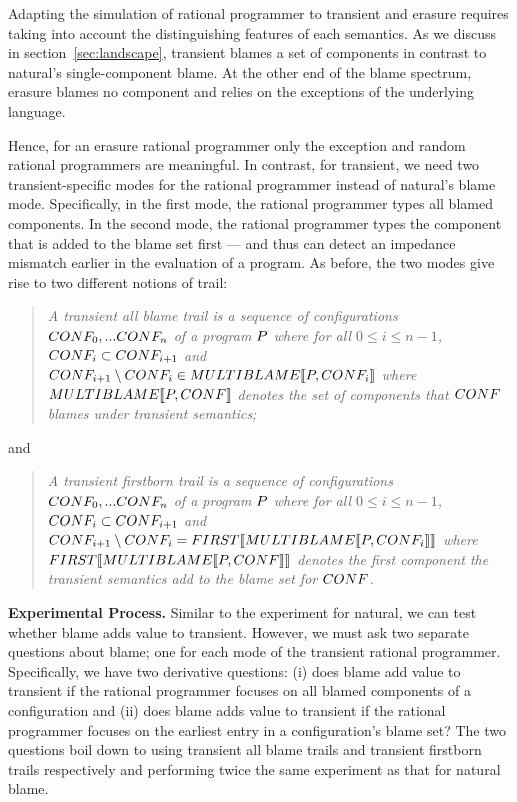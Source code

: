 Adapting the simulation of rational programmer to transient
and erasure requires taking into account the distinguishing
features of each semantics. As we discuss in section~\ref{sec:landscape}, 
transient blames a set of components in contrast to natural's
single-component blame. At the other end of the blame spectrum, erasure
blames no component and relies on the exceptions of the underlying
language.

Hence, for an erasure rational programmer only the exception and random 
rational programmers are meaningful. In contrast, for transient, we 
need two transient-specific modes for the rational
programmer instead of natural's blame mode. Specifically, in the first mode, the rational programmer types
all blamed components.  In the second mode, the rational programmer types
the component that is added to the blame set first --- and thus can 
detect an impedance mismatch earlier in the evaluation of a program. 
As before, the two modes give
rise to two different notions of trail:
\begin{quote}
\it 
A  transient all blame trail
is a sequence of configurations $CONF_0,...CONF_n$ of a program
$P$ where for all $0 \leq i \leq n - 1$, $CONF_i \subset CONF_{i+1}$ and
~$CONF_{i+1} \setminus CONF_i \in MULTIBLAME\llbracket P, CONF_i\rrbracket$
where $MULTIBLAME\llbracket P, CONF\rrbracket$ denotes the set of components that $CONF$
blames under transient semantics; 
\end{quote}
\noindent
and
\begin{quote}
\it 
A transient firstborn  trail
is a sequence of configurations $CONF_0,...CONF_n$ of a program
$P$ where for all $0 \leq i \leq n - 1$, $CONF_i \subset CONF_{i+1}$ and
  $CONF_{i+1} \setminus CONF_i = FIRST\llbracket MULTIBLAME\llbracket P, CONF_i\rrbracket\rrbracket$
  where $FIRST\llbracket MULTIBLAME\llbracket P, CONF\rrbracket\rrbracket$ denotes the first component 
  the transient semantics add to the blame set for $CONF$.
\end{quote}


\noindent
{\bf Experimental Process.} Similar to the experiment for natural, we can
test whether blame adds value to transient. However, we must ask two
separate questions about blame; one for each mode of the transient
rational programmer. Specifically, we have two derivative questions: (i)
does blame add value to transient if the rational programmer focuses on all
blamed components of a configuration and (ii) does blame adds value to
transient if the rational programmer focuses on the earliest entry in a
configuration's blame set? The two questions boil down to using 
transient all blame trails and transient
firstborn trails respectively and performing twice the same experiment as that
for natural blame. 

